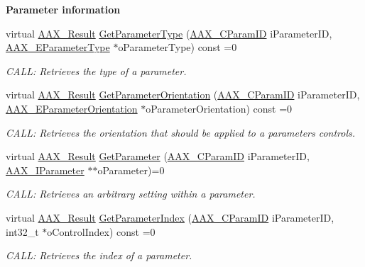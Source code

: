 \begin{Indent}{\bf Parameter information}
\begin{DoxyCompactItemize}
virtual \hyperlink{a00149_a4d8f69a697df7f70c3a8e9b8ee130d2f}{A\+A\+X\+\_\+\+Result} \hyperlink{a00061_ae7f6d803fa9a472a4bad583868e3b951}{Get\+Parameter\+Type} (\hyperlink{a00149_a1440c756fe5cb158b78193b2fc1780d1}{A\+A\+X\+\_\+\+C\+Param\+I\+D} i\+Parameter\+I\+D, \hyperlink{a00206_a4cd0f189daa9a60cf36883c56344bb2e}{A\+A\+X\+\_\+\+E\+Parameter\+Type} $\ast$o\+Parameter\+Type) const =0
\begin{DoxyCompactList}\small\item\em C\+A\+L\+L\+: Retrieves the type of a parameter. \end{DoxyCompactList}\item 
virtual \hyperlink{a00149_a4d8f69a697df7f70c3a8e9b8ee130d2f}{A\+A\+X\+\_\+\+Result} \hyperlink{a00061_ac122e1a693296b059dca4350a5ff1dfe}{Get\+Parameter\+Orientation} (\hyperlink{a00149_a1440c756fe5cb158b78193b2fc1780d1}{A\+A\+X\+\_\+\+C\+Param\+I\+D} i\+Parameter\+I\+D, \hyperlink{a00206_a52f91d1c14aa5dceedabfb9d2de31bf0}{A\+A\+X\+\_\+\+E\+Parameter\+Orientation} $\ast$o\+Parameter\+Orientation) const =0
\begin{DoxyCompactList}\small\item\em C\+A\+L\+L\+: Retrieves the orientation that should be applied to a parameter\textquotesingle{}s controls. \end{DoxyCompactList}\item 
virtual \hyperlink{a00149_a4d8f69a697df7f70c3a8e9b8ee130d2f}{A\+A\+X\+\_\+\+Result} \hyperlink{a00061_a169b7e9fe64f2d86d20fffc152b5e365}{Get\+Parameter} (\hyperlink{a00149_a1440c756fe5cb158b78193b2fc1780d1}{A\+A\+X\+\_\+\+C\+Param\+I\+D} i\+Parameter\+I\+D, \hyperlink{a00108}{A\+A\+X\+\_\+\+I\+Parameter} $\ast$$\ast$o\+Parameter)=0
\begin{DoxyCompactList}\small\item\em C\+A\+L\+L\+: Retrieves an arbitrary setting within a parameter. \end{DoxyCompactList}\item 
virtual \hyperlink{a00149_a4d8f69a697df7f70c3a8e9b8ee130d2f}{A\+A\+X\+\_\+\+Result} \hyperlink{a00061_aff1ff6b27973200429f057dc003f30a8}{Get\+Parameter\+Index} (\hyperlink{a00149_a1440c756fe5cb158b78193b2fc1780d1}{A\+A\+X\+\_\+\+C\+Param\+I\+D} i\+Parameter\+I\+D, int32\+\_\+t $\ast$o\+Control\+Index) const =0
\begin{DoxyCompactList}\small\item\em C\+A\+L\+L\+: Retrieves the index of a parameter. \end{DoxyCompactList}\item 
$$
\end{DoxyCompactItemize}
\end{Indent}
